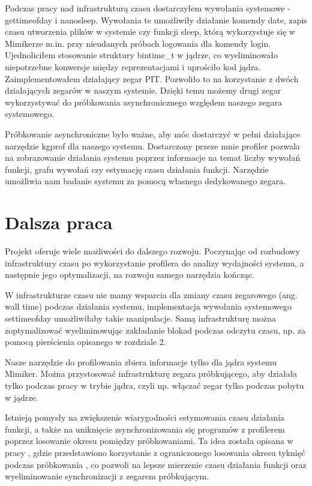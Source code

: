 \documentclass[shortabstract]{iithesis}
\theoremstyle{definition} \newtheorem*{definition}{Definicja}
\theoremstyle{definition} \newtheorem*{example}{Przykład}
\theoremstyle{definition} \newtheorem*{remark}{Uwaga}
\begin{document}
Podczas pracy nad infrastrukturą czasu dostarczyłem wywołania systemowe - gettimeofday i nanosleep. Wywołania te umożliwiły działanie komendy date, zapis  czasu utworzenia plików w systemie czy funkcji sleep, którą wykorzystuje się w Mimikerze m.in. przy nieudanych próbach logowania dla komendy login. Ujednoliciłem stosowanie struktury bintime\_t w jądrze, co wyeliminowało niepotrzebne konwersje między reprezentacjami i uprościło kod jądra. Zaimplementowałem działający zegar PIT. Pozwoliło to na korzystanie z dwóch działających zegarów w naszym systemie. Dzięki temu możemy drugi zegar wykorzystywać do próbkowania asynchronicznego względem naszego zegara systemowego.

Próbkowanie asynchroniczne było ważne, aby móc dostarczyć w pełni działające narzędzie kgprof dla naszego systemu. 
Dostarczony przeze mnie profiler pozwala na zobrazowanie działania systemu poprzez informacje na temat liczby wywołań funkcji, grafu wywołań czy estymację czasu działania funkcji. Narzędzie umożliwia nam badanie systemu za pomocą własnego dedykowanego zegara.

\section{Dalsza praca}

Projekt oferuje wiele możliwości do dalszego rozwoju. Poczynając od rozbudowy infrastruktury czasu po wykorzystanie profilera do analizy wydajności systemu, a następnie jego optymalizacji, na rozwoju samego narzędzia kończąc.

W infrastrukturze czasu nie mamy wsparcia dla zmiany czasu zegarowego (ang. wall time) podczas działania systemu, implementacja wywołania systemowego settimeofday umożliwiłaby takie manipulacje. Samą infrastrukturę można zoptymalizować wyeliminowując zakładanie blokad podczas odczytu czasu, np. za pomocą pierścienia opisanego w rozdziale 2.

Nasze narzędzie do profilowania zbiera informacje tylko dla jądra systemu Mimiker. Można przystosować infrastrukturę zegara próbkującego, aby działała tylko podczas pracy w trybie jądra, czyli np. włączać zegar tylko podczas pobytu w jądrze.

Istnieją pomysły na zwiększenie wiarygodności estymowania czasu działania funkcji, a także na uniknięcie zsynchronizowania się programów z profilerem poprzez losowanie okresu pomiędzy próbkowaniami. Ta idea została opisana w pracy \cite{bib:randomizedgprof}, gdzie przedstawiono korzystanie z ograniczonego losowania okresu tyknięć podczas próbkowania \cite{bib:randomizedgprof}, co pozwoli na lepsze mierzenie czasu działania funkcji oraz wyeliminowanie synchronizacji z zegarem próbkującym. 
\end{document}

